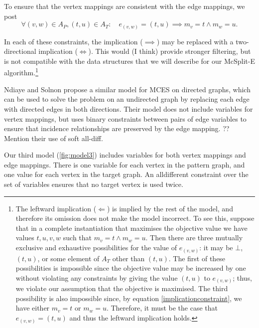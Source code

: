 To ensure that the vertex mappings are consistent with the edge mappings, we post
\begin{equation}
\label{implicationconstraint}
\forall (v,w) \in A_P, (t,u) \in A_T : \quad e_{(v,w)} = (t,u) \implies m_v=t \wedge m_w=u.
\end{equation}

In each of these constraints, the implication ($\implies$) may be replaced with a two-directional
implication ($\Longleftrightarrow$).  This would (I think) provide stronger filtering, but is not
compatible with the data structures that we will describe for our McSplit-E
algorithm.\footnote{The leftward implication ($\Longleftarrow$)
is implied by the rest of the model, and therefore its omission does not make the model incorrect.
To see this, suppose that in a complete instantiation that maximises the objective value
we have values $t,u,v,w$ such
that $m_v=t \wedge m_w=u$.  Then there are three mutually exclusive and exhaustive possibilities for the
value of $e_{(v,w)}$: it may be $\bot$, $(t,u)$, or some element of $A_T$ other than $(t,u)$.
The first of these possibilities is impossible since the objective
value may be increased by one without violating any constraints by giving the value $(t,u)$ to $e_{(v,w)}$;
thus, we violate our assumption that the objective is maximised.
The third possibility is also impossible since, by equation \ref{implicationconstraint}, we have
either $m_v=t$ or $m_w=u$.  Therefore, it must be the case that $e_{(v,w)} = (t,u)$
and thus the leftward implication holds.}

Ndiaye and Solnon \cite{DBLP:conf/cp/NdiayeS11} propose a similar model for MCES on directed graphs,
which can be used to solve the problem on an undirected graph by replacing each edge with directed
edges in both directions.  Their model does not include variables for vertex mappings, but uses binary
constraints between pairs of edge variables to ensure that incidence relationships are preserved
by the edge mapping.  ?? Mention their use of soft all-diff.

%

Our third model (\cref{fig:model3}) includes variables for both vertex mappings and edge mappings.
There is one variable for each vertex in the pattern graph, and one value
for each vertex in the target graph.  An alldifferent constraint over the set of variables ensures
that no target vertex is used twice.  

